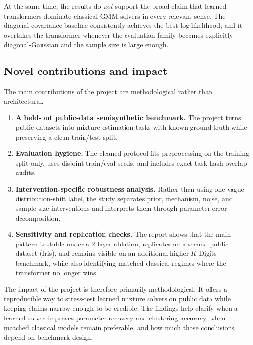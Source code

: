 \documentclass{article}
\begin{document}
At the same time, the results do \emph{not} support the broad claim that learned transformers dominate classical GMM solvers in every relevant sense. The diagonal-covariance baseline consistently achieves the best log-likelihood, and it overtakes the transformer whenever the evaluation family becomes explicitly diagonal-Gaussian and the sample size is large enough.

\subsection{Novel contributions and impact}
The main contributions of the project are methodological rather than architectural.
\begin{enumerate}[leftmargin=1.4em]
    \item \textbf{A held-out public-data semisynthetic benchmark.} The project turns public datasets into mixture-estimation tasks with known ground truth while preserving a clean train/test split.
    \item \textbf{Evaluation hygiene.} The cleaned protocol fits preprocessing on the training split only, uses disjoint train/eval seeds, and includes exact task-hash overlap audits.
    \item \textbf{Intervention-specific robustness analysis.} Rather than using one vague distribution-shift label, the study separates prior, mechanism, noise, and sample-size interventions and interprets them through parameter-error decomposition.
    \item \textbf{Sensitivity and replication checks.} The report shows that the main pattern is stable under a 2-layer ablation, replicates on a second public dataset (Iris), and remains visible on an additional higher-$K$ Digits benchmark, while also identifying matched classical regimes where the transformer no longer wins.
\end{enumerate}

The impact of the project is therefore primarily methodological. It offers a reproducible way to stress-test learned mixture solvers on public data while keeping claims narrow enough to be credible. The findings help clarify when a learned solver improves parameter recovery and clustering accuracy, when matched classical models remain preferable, and how much those conclusions depend on benchmark design.
\end{document}
